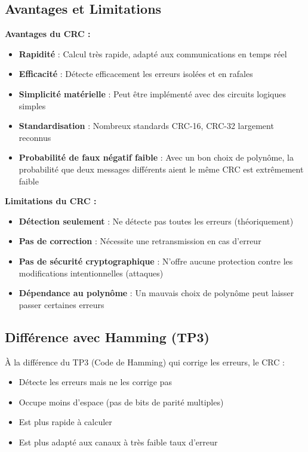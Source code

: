 \documentclass[12pt, a4paper]{article}
\begin{document}
\subsection{Avantages et Limitations}

\textbf{Avantages du CRC :}
\begin{itemize}
    \item \textbf{Rapidité} : Calcul très rapide, adapté aux communications en temps réel
    \item \textbf{Efficacité} : Détecte efficacement les erreurs isolées et en rafales
    \item \textbf{Simplicité matérielle} : Peut être implémenté avec des circuits logiques simples
    \item \textbf{Standardisation} : Nombreux standards CRC-16, CRC-32 largement reconnus
    \item \textbf{Probabilité de faux négatif faible} : Avec un bon choix de polynôme, la probabilité que deux messages différents aient le même CRC est extrêmement faible
\end{itemize}

\textbf{Limitations du CRC :}
\begin{itemize}
    \item \textbf{Détection seulement} : Ne détecte pas toutes les erreurs (théoriquement)
    \item \textbf{Pas de correction} : Nécessite une retransmission en cas d'erreur
    \item \textbf{Pas de sécurité cryptographique} : N'offre aucune protection contre les modifications intentionnelles (attaques)
    \item \textbf{Dépendance au polynôme} : Un mauvais choix de polynôme peut laisser passer certaines erreurs
\end{itemize}

\subsection{Différence avec Hamming (TP3)}

À la différence du TP3 (Code de Hamming) qui corrige les erreurs, le CRC :
\begin{itemize}
    \item Détecte les erreurs mais ne les corrige pas
    \item Occupe moins d'espace (pas de bits de parité multiples)
    \item Est plus rapide à calculer
    \item Est plus adapté aux canaux à très faible taux d'erreur
\end{itemize}
\end{document}
